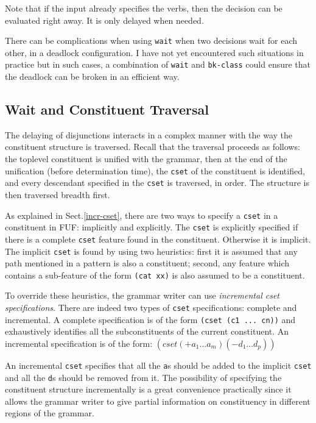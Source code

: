 \documentclass[10pt,a4paper]{report}
\begin{document}
Note that if the input already specifies the verbs, then the decision can
be evaluated right away.  It is only delayed when needed.

There can be complications when using {\tt wait} when two decisions wait for
each other, in a deadlock configuration.  I have not yet encountered such
situations in practice but in such cases, a combination of {\tt wait} and
{\tt bk-class} could ensure that the deadlock can be broken in an efficient
way.

\subsection{Wait and Constituent Traversal}
\label{wait-cset}

The delaying of disjunctions interacts in a complex manner with the way the
constituent structure is traversed.  Recall that the traversal proceeds as
follows: the toplevel constituent is unified with the grammar, then at the
end of the unification (before determination time), the {\tt cset} of the
constituent is identified, and every descendant specified in the {\tt cset}
is traversed, in order.  The structure is then traversed breadth first.

As explained in Sect.\ref{incr-cset}, there are two ways to specify a
{\tt cset} in a constituent in FUF: implicitly and explicitly.  The
{\tt cset} is explicitly specified if there is a complete {\tt cset} feature
found in the constituent.  Otherwise it is implicit.  The implicit {\tt cset}
is found by using two heuristics: first it is assumed that any path
mentioned in a pattern is also a constituent; second, any feature which
contains a sub-feature of the form {\tt (cat xx)} is also assumed to be a
constituent.

To override these heuristics, the grammar writer can use {\em incremental
cset specifications}.  There are indeed two types of {\tt cset}
specifications: complete and incremental.  A complete specification is of
the form {\tt (cset (c1 ...  cn))} and exhaustively identifies all the
subconstituents of the current constituent.  An incremental specification
is of the form:
$(cset (+ a_{1} ... a_{m}) (- d_{1} ... d_{p}))$

An incremental {\tt cset} specifies that all the {\tt a}s should be added
to the implicit {\tt cset} and all the {\tt d}s should be removed from it.
The possibility of specifying the constituent structure incrementally is a
great convenience practically since it allows the grammar writer to give
partial information on constituency in different regions of the grammar.
\end{document}
